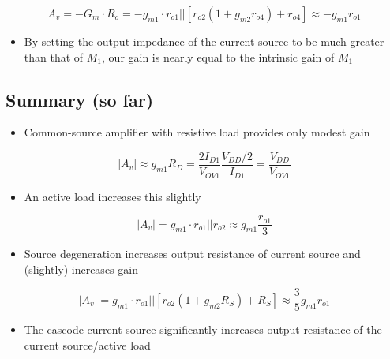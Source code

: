 \documentclass[11pt]{article}
\providecommand{\tightlist}{%
      \setlength{\itemsep}{0pt}\setlength{\parskip}{0pt}}
\begin{document}
\begin{equation}
A_v = -G_m \cdot R_o = -g_{m1}\cdot r_{o1}||\left[r_{o2}(1+g_{m2} r_{o4}) + r_{o4}\right] \approx -g_{m1}r_{o1}
\end{equation}

\begin{itemize}
\tightlist
\item
  By setting the output impedance of the current source to be much
  greater than that of \(M_1\), our gain is nearly equal to the
  intrinsic gain of \(M_1\)
\end{itemize}

    \hypertarget{summary-so-far}{%
\subsection{Summary (so far)}\label{summary-so-far}}

    \begin{itemize}
\tightlist
\item
  Common-source amplifier with resistive load provides only modest gain
\end{itemize}

\begin{equation}
|A_v| \approx g_{m1}R_D = \dfrac{2I_{D1}}{V_{OV1}}\dfrac{V_{DD}/2}{I_{D1}} = \dfrac{V_{DD}}{V_{OV1}}
\end{equation}

\begin{itemize}
\tightlist
\item
  An active load increases this slightly
\end{itemize}

\begin{equation}
|A_v| = g_{m1} \cdot r_{o1}||r_{o2} \approx g_{m1}\dfrac{r_{o1}}{3}
\end{equation}

\begin{itemize}
\tightlist
\item
  Source degeneration increases output resistance of current source and
  (slightly) increases gain
\end{itemize}

\begin{equation}
|A_v| = g_{m1}\cdot r_{o1}||\left[r_{o2}(1+g_{m2} R_{S}) + R_{S}\right] \approx \dfrac{3}{5}g_{m1}r_{o1}
\end{equation}

\begin{itemize}
\tightlist
\item
  The cascode current source significantly increases output resistance
  of the current source/active load
\end{itemize}
\end{document}
